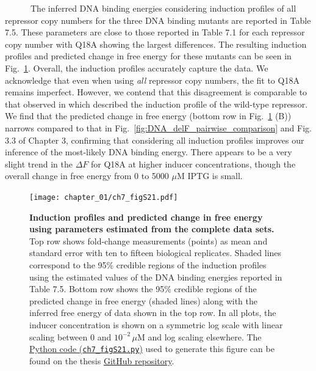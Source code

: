 \documentclass[12pt]{caltech_thesis}
\begin{document}
~~~~~~The inferred DNA binding energies considering induction profiles
of all repressor copy numbers for the three DNA binding mutants are
reported in Table 7.5. These parameters are close to those reported in
Table 7.1 for each repressor copy number with Q18A showing the largest
differences. The resulting induction profiles and predicted change in
free energy for these mutants can be seen in
Fig.~\ref{fig:global_DNA_profiles}. Overall, the induction profiles
accurately capture the data. We acknowledge that even when using
\emph{all} repressor copy numbers, the fit to Q18A remains imperfect.
However, we contend that this disagreement is comparable to that
observed in \textcite{razo-mejia2018} which described the induction
profile of the wild-type repressor. We find that the predicted change in
free energy (bottom row in Fig.~\ref{fig:global_DNA_profiles} (B))
narrows compared to that in Fig.~\ref{fig:DNA_delF_pairwise_comparison}
and Fig. 3.3 of Chapter 3, confirming that considering all induction
profiles improves our inference of the most-likely DNA binding energy.
There appears to be a very slight trend in the \(\Delta F\) for Q18A at
higher inducer concentrations, though the overall change in free energy
from 0 to 5000 \(\mu\)M IPTG is small.

\hypertarget{fig:global_DNA_profiles}{%
\begin{figure}
\centering
\texttt{[image: chapter\_01/ch7\_figS21.pdf]}
\caption[{Induction profiles and predicted change in free energy using
parameters estimated from the complete data sets.}]{\textbf{Induction
profiles and predicted change in free energy using parameters estimated
from the complete data sets.} Top row shows fold-change measurements
(points) as mean and standard error with ten to fifteen biological
replicates. Shaded lines correspond to the 95\% credible regions of the
induction profiles using the estimated values of the DNA binding
energies reported in Table 7.5. Bottom row shows the 95\% credible
regions of the predicted change in free energy (shaded lines) along with
the inferred free energy of data shown in the top row. In all plots, the
inducer concentration is shown on a symmetric log scale with linear
scaling between 0 and \(10^{-2}\,\mu\)M and log scaling elsewhere. The
\href{https://github.com/gchure/phd/blob/master/src/chapter_07/code/ch7_figS21.py}{Python
code (\texttt{ch7\_figS21.py})} used to generate this figure can be
found on the thesis \href{https://github.com/gchure/phd}{GitHub
repository}.}
\label{fig:global_DNA_profiles}
\end{figure}
}
\end{document}
